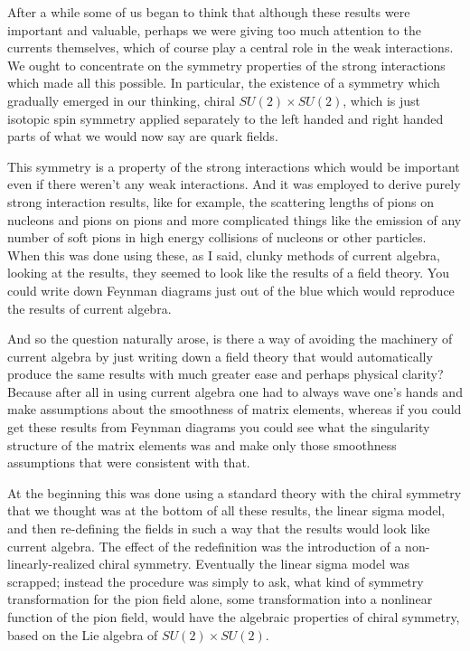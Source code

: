 \documentclass[12pt]{article}
\begin{document}
After a while some of us began to think that although these results were important and valuable, perhaps we were giving too much attention to the currents themselves, which of course play a central role in the weak interactions. We ought to concentrate on the symmetry properties of the strong interactions which made all this possible. In particular, the existence of a symmetry which gradually emerged in our thinking, chiral $SU(2)\times SU(2)$, which is just isotopic spin symmetry applied separately to the left handed and right handed parts of what we would now say are quark fields. 

This symmetry is a property of the strong interactions which would be important even if there weren't any weak interactions. And it was employed to derive purely strong interaction results, like for example, the scattering lengths of pions on nucleons and pions on pions
and more complicated things like the emission of any number of soft pions in high energy collisions of   nucleons or other particles. When this was done using these, as I said, clunky methods of current algebra, looking at the results, they seemed to look like the results of a field theory. You could write down Feynman diagrams just out of the blue which would reproduce the results of current algebra. 

And so the question naturally arose, is there a way of avoiding the machinery of current algebra by just writing down a field theory that would automatically produce the same results with much greater ease and perhaps physical clarity? Because after all in using current algebra one had to always wave one's hands and make assumptions about the smoothness of matrix elements, whereas if you could get these results from Feynman diagrams you could see what the singularity structure of the matrix elements was and make only those smoothness assumptions that were consistent with that. 

At the beginning this was done using a standard theory with the chiral symmetry that we thought was at the bottom of all these results, the linear sigma model, and then re-defining the fields in such a way that the results would look like current algebra.  The effect of the redefinition was the introduction of a non-linearly-realized chiral symmetry.  Eventually the linear sigma model was scrapped;  instead the procedure was simply to ask, what kind of symmetry transformation for the pion field alone, some transformation into a nonlinear function of the pion field, would have the algebraic properties of  chiral symmetry, based on the Lie algebra of $SU(2)\times SU(2)$. 
\end{document}
